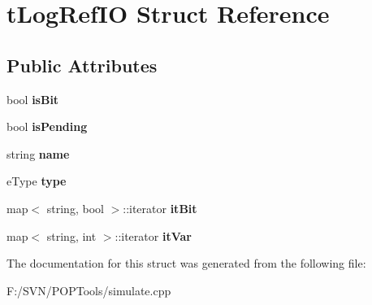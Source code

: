 \hypertarget{structt_log_ref_i_o}{\section{t\-Log\-Ref\-I\-O Struct Reference}
\label{structt_log_ref_i_o}
}
\subsection*{Public Attributes}
\begin{DoxyCompactItemize}
\item 
\hypertarget{structt_log_ref_i_o_a54308bb5d6b9828099a1bd93240d313f}{bool {\bfseries is\-Bit}}\label{structt_log_ref_i_o_a54308bb5d6b9828099a1bd93240d313f}

\item 
\hypertarget{structt_log_ref_i_o_a4f4583a63346e2b66428ef9cd71d68aa}{bool {\bfseries is\-Pending}}\label{structt_log_ref_i_o_a4f4583a63346e2b66428ef9cd71d68aa}

\item 
\hypertarget{structt_log_ref_i_o_afe766343ce4aad9b9a288b132d63835b}{string {\bfseries name}}\label{structt_log_ref_i_o_afe766343ce4aad9b9a288b132d63835b}

\item 
\hypertarget{structt_log_ref_i_o_ae92e449615588897bb7eec873978ca59}{e\-Type {\bfseries type}}\label{structt_log_ref_i_o_ae92e449615588897bb7eec873978ca59}

\item 
\hypertarget{structt_log_ref_i_o_a9ac14cec108e32b38f28589dc4295d09}{map$<$ string, bool $>$\-::iterator {\bfseries it\-Bit}}\label{structt_log_ref_i_o_a9ac14cec108e32b38f28589dc4295d09}

\item 
\hypertarget{structt_log_ref_i_o_a8cf9a8d2649cd0124fb602a10fd08e44}{map$<$ string, int $>$\-::iterator {\bfseries it\-Var}}\label{structt_log_ref_i_o_a8cf9a8d2649cd0124fb602a10fd08e44}

\end{DoxyCompactItemize}


The documentation for this struct was generated from the following file\-:\begin{DoxyCompactItemize}
\item 
F\-:/\-S\-V\-N/\-P\-O\-P\-Tools/simulate.\-cpp\end{DoxyCompactItemize}
